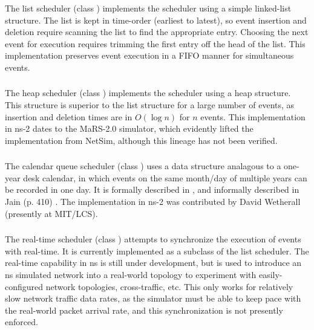 \subsubsection{}

The list scheduler (class ) implements the scheduler
using a simple linked-list structure.
The list is kept in time-order (earliest to latest), so event
insertion and deletion require scanning the list to find the
appropriate entry.
Choosing the next event for execution requires trimming the first
entry off the head of the list.
This implementation preserves event execution in a FIFO manner
for simultaneous events.

\subsubsection{}

The heap scheduler (class ) implements the scheduler
using a heap structure.
This structure is superior to the list structure for a large number
of events, as insertion and deletion times are in $O(\log n)$
for $n$ events.
This implementation in ns-2 dates to the MaRS-2.0 simulator, which evidently
lifted the implementation from NetSim, although this lineage has not
been verified.

\subsubsection{}

The calendar queue scheduler (class )
uses a data structure analagous to a one-year desk calendar,
in which events on the same month/day of multiple years can be recorded in
one day.
It is formally described in \cite{calendarqueue}, and informally described
in Jain (p. 410) \cite{Jain}.
The implementation in ns-2 was contributed by David Wetherall (presently
at MIT/LCS).

\subsubsection{}

The real-time scheduler (class )
attempts to synchronize the execution of events with real-time.
It is currently implemented as a subclass of the list scheduler.
The real-time capability in ns is still under development, but is used
to introduce an ns simulated network into a real-world topology
to experiment with easily-configured network topologies, cross-traffic, etc. 
This only works for relatively slow network traffic data rates, as the
simulator must be able to keep pace with the real-world packet arrival
rate, and this synchronization is not presently enforced.


